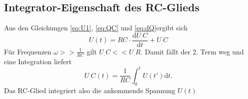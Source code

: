 \subsection{Integrator-Eigenschaft des RC-Glieds}
Aus den Gleichungen \eqref{eq:U1}, \eqref{eq:QC} und \eqref{eq:dQ}ergibt sich
\[
U(t)=RC\cdot\frac{\mathrm{d}U_.C}{\mathrm{d}t} + U_.C
\]
Für Frequenzen $\omega >> \frac{1}{RC}$ gilt $U_.C << U_.R$. Damit fällt der 2. Term weg und eine Integration liefert
\[
U_.C(t)=\frac{1}{RC}\int_0^tU(t')\mathrm{d}t\text{.}
\]
Das RC-Glied integriert also die ankommende Spannung $U(t)$